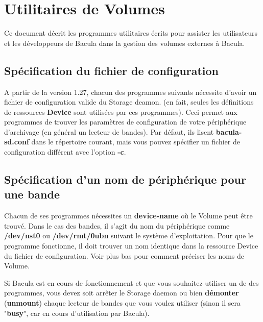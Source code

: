 
\chapter{Utilitaires de Volumes}
\label{_UtilityChapter}

Ce document décrit les programmes utilitaires écrits pour assister les
utilisateurs et les développeurs de Bacula dans la gestion des volumes
externes à Bacula.

\section{Spécification du fichier de configuration}

A partir de la version 1.27, chacun des programmes suivants nécessite
d'avoir un fichier de configuration valide du Storage deamon. (en fait, seules
les définitions de ressources  {\bf Device} sont utilisées par ces 
programmes). Ceci permet aux programmes de trouver les paramètres de
configuration de votre périphérique d'archivage (en général un lecteur
de bandes). Par défaut, ils lisent {\bf bacula-sd.conf} dans le répertoire 
courant, mais vous pouvez spécifier un fichier de configuration différent
avec l'option {\bf -c}.

\section{Spécification d'un nom de périphérique pour une bande}

Chacun de ses programmes nécessites un {\bf device-name} où le Volume
peut être trouvé. Dans le cas des bandes, il s'agit du nom du périphérique
comme {\bf /dev/nst0} ou {\bf /dev/rmt/0ubn} suivant le système d'exploitation.
Pour que le programme fonctionne, il doit trouver un nom identique dans la 
ressource Device du fichier de configuration. Voir plus bas pour comment
préciser les noms de Volume.

Si Bacula est en cours de fonctionnement et que vous souhaitez utiliser un de
des programmes, vous devez soit arrêter le Storage daemon ou bien 
{\bf démonter} ({\bf unmount}) chaque lecteur de bandes que vous voulez 
utiliser (sinon il sera "{\bf busy}", car en cours d'utilisation par Bacula). 


